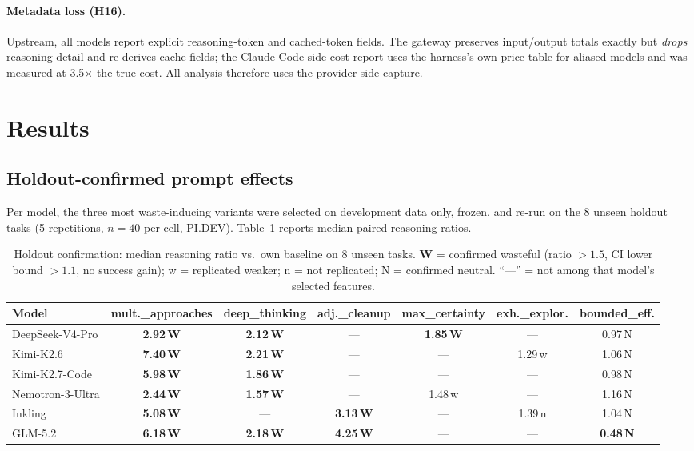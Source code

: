 \documentclass[11pt]{article}
\newcommand{\pidev}{PI.DEV}
\newcommand{\cc}{Claude Code}
\newcommand{\xd}{$\times$}
\begin{document}
\paragraph{Metadata loss (H16).}
Upstream, all models report explicit reasoning-token and cached-token
fields. The gateway preserves input/output totals exactly but
\emph{drops} reasoning detail and re-derives cache fields; the \cc{}-side
cost report uses the harness's own price table for aliased models and was
measured at 3.5\xd{} the true cost. All analysis therefore uses the
provider-side capture.

\section{Results}

\subsection{Holdout-confirmed prompt effects}

Per model, the three most waste-inducing variants were selected on
development data only, frozen, and re-run on the 8 unseen holdout tasks
(5 repetitions, $n{=}40$ per cell, \pidev). Table~\ref{tab:holdout}
reports median paired reasoning ratios.

\begin{table}[t]
\centering
\small
\begin{tabular}{lcccccc}
\toprule
Model & mult.\_approaches & deep\_thinking & adj.\_cleanup &
max\_certainty & exh.\_explor. & bounded\_eff. \\
\midrule
DeepSeek-V4-Pro & \textbf{2.92\,W} & \textbf{2.12\,W} & --- & \textbf{1.85\,W} & --- & 0.97\,N \\
Kimi-K2.6 & \textbf{7.40\,W} & \textbf{2.21\,W} & --- & --- & 1.29\,w & 1.06\,N \\
Kimi-K2.7-Code & \textbf{5.98\,W} & \textbf{1.86\,W} & --- & --- & --- & 0.98\,N \\
Nemotron-3-Ultra & \textbf{2.44\,W} & \textbf{1.57\,W} & --- & 1.48\,w & --- & 1.16\,N \\
Inkling & \textbf{5.08\,W} & --- & \textbf{3.13\,W} & --- & 1.39\,n & 1.04\,N \\
GLM-5.2 & \textbf{6.18\,W} & \textbf{2.18\,W} & \textbf{4.25\,W} & --- & --- & \textbf{0.48\,N} \\
\bottomrule
\end{tabular}
\caption{Holdout confirmation: median reasoning ratio vs.\ own baseline on
8 unseen tasks. \textbf{W} = confirmed wasteful (ratio $>1.5$, CI lower
bound $>1.1$, no success gain); w = replicated weaker; n = not replicated;
N = confirmed neutral. ``---'' = not among that model's selected
features.}
\label{tab:holdout}
\end{table}
\end{document}

